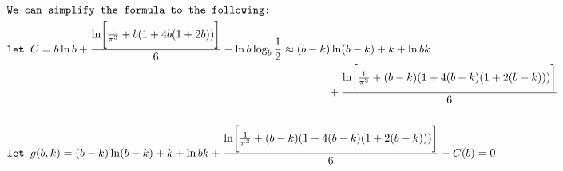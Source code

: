 \documentclass[11pt]{article}
\theoremstyle{definition}
\theoremstyle{remark}
\begin{document}
\thispagestyle{empty} %
\[
\begin{aligned}
&\texttt{We can simplify the formula to the following:} \\
& \texttt{let } C = b\ln b + \frac{\ln \biggl[\frac{1}{\pi^3} + b(1+4b(1+2b)) \biggr]}{6} - \ln b \log_b\frac{1}{2} \approx (b-k)\ln(b-k) + k + \ln b k  \\ 
& \hspace{10.1cm} + \frac{\ln \biggl[\frac{1}{\pi^3} + (b-k)(1+4(b-k)(1+2(b-k)))\biggr]}{6} \\
& \\
& \texttt{let } g(b, k) = (b-k)\ln(b-k) + k + \ln b k + \frac{\ln \biggl[\frac{1}{\pi^3} + (b-k)(1+4(b-k)(1+2(b-k)))\biggr]}{6} - C(b) = 0\\
\end{aligned}
\]

\end{document}
